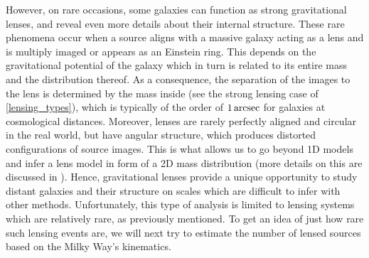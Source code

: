 However, on rare occasions, some galaxies can function as strong gravitational
lenses, and reveal even more details about their internal structure.  These rare
phenomena occur when a source aligns with a massive galaxy acting as a lens and
is multiply imaged or appears as an Einstein ring.  This depends on the
gravitational potential of the galaxy which in turn is related to its entire
mass and the distribution thereof.  As a consequence, the separation of the
images to the lens is determined by the mass inside (see the strong lensing case
of \eqref{lensing_types}), which is typically of the order of $1\,\mathrm{arcsec}$ for
galaxies at cosmological distances.  Moreover, lenses are rarely perfectly
aligned and circular in the real world, but have angular structure, which
produces distorted configurations of source images.  This is what allows us to
go beyond 1D models and infer a lens model in form of a 2D mass distribution
(more details on this are discussed in ).  Hence, gravitational
lenses provide a unique opportunity to study distant galaxies and their
structure on scales which are difficult to infer with other methods.
Unfortunately, this type of analysis is limited to lensing systems which are
relatively rare, as previously mentioned.  To get an idea of just how rare such
lensing events are, we will next try to estimate the number of lensed sources
based on the Milky Way's kinematics.

